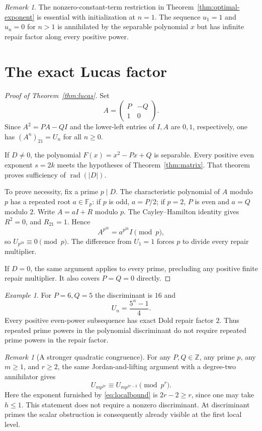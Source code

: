 \documentclass[11pt]{article}
\theoremstyle{remark}
\newtheorem{remark}[theorem]{Remark}
\newtheorem{example}[theorem]{Example}
\newcommand{\rad}{\operatorname{rad}}
\begin{document}
\begin{remark}
The nonzero-constant-term restriction in Theorem~\ref{thm:optimal-exponent} is essential with initialization at $n=1$. The sequence $u_1=1$ and $u_n=0$ for $n>1$ is annihilated by the separable polynomial $x$ but has infinite repair factor along every positive power.
\end{remark}

\section{The exact Lucas factor}

\begin{proof}[Proof of Theorem~\ref{thm:lucas}]
Set
\[
 A=\begin{pmatrix}P&-Q\\1&0\end{pmatrix}.
\]
Since $A^2=PA-QI$ and the lower-left entries of $I,A$ are $0,1$, respectively, one has $(A^n)_{21}=U_n$ for all $n\geq0$.

If $D\neq0$, the polynomial $F(x)=x^2-Px+Q$ is separable. Every positive even exponent $s=2k$ meets the hypotheses of Theorem~\ref{thm:matrix}. That theorem proves sufficiency of $\rad(|D|)$.

To prove necessity, fix a prime $p\mid D$. The characteristic polynomial of $A$ modulo $p$ has a repeated root $a\in\mathbb F_p$: if $p$ is odd, $a=P/2$; if $p=2$, $P$ is even and $a=Q$ modulo $2$. Write $A=aI+R$ modulo $p$. The Cayley--Hamilton identity gives $R^2=0$, and $R_{21}=1$. Hence
\[
 A^{p^{2k}}=a^{p^{2k}}I\pmod p,
\]
so $U_{p^{2k}}\equiv0\pmod p$. The difference from $U_1=1$ forces $p$ to divide every repair multiplier.

If $D=0$, the same argument applies to every prime, precluding any positive finite repair multiplier. It also covers $P=Q=0$ directly.
\end{proof}

\begin{example}
For $P=6,Q=5$ the discriminant is $16$ and
\[
 U_n=\frac{5^n-1}{4}.
\]
Every positive even-power subsequence has exact Dold repair factor $2$. Thus repeated prime powers in the polynomial discriminant do not require repeated prime powers in the repair factor.
\end{example}

\begin{remark}[A stronger quadratic congruence]
For any $P,Q\in\mathbb Z$, any prime $p$, any $m\geq1$, and $r\geq2$, the same Jordan-and-lifting argument with a degree-two annihilator gives
\[
 U_{m p^{2r}}\equiv U_{m p^{2r-2}}\pmod{p^r}.
\]
Here the exponent furnished by \eqref{eq:localbound} is $2r-2\geq r$, since one may take $h\leq1$. This statement does not require a nonzero discriminant. At discriminant primes the scalar obstruction is consequently already visible at the first local level.
\end{remark}
\end{document}

